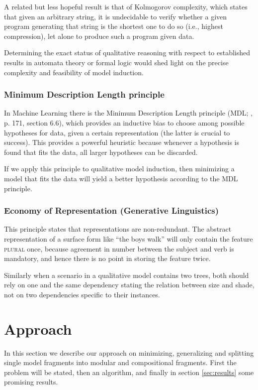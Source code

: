 \documentclass{article} %
\begin{document}
	A related but less hopeful result is that of Kolmogorov complexity,
	which states that given an arbitrary string, it is undecidable to
	verify whether a given program generating that string is the shortest
	one to do so (i.e., highest compression), let alone to produce such a
	program given data.

	Determining the exact status of qualitative reasoning with respect to
	established results in automata theory or formal logic would shed light
	on the precise complexity and feasibility of model induction.

\subsubsection{Minimum Description Length principle}

	In Machine Learning there is the Minimum Description Length principle
	(MDL; \cite{mitchell}, p. 171, section 6.6), which provides an
	inductive bias to choose among possible hypotheses for data, given a
	certain representation (the latter is crucial to success).  This
	provides a powerful heuristic because whenever a hypothesis is found
	that fits the data, all larger hypotheses can be discarded.
	
	If we apply this principle to qualitative model induction, then
	minimizing a model that fits the data will yield a better hypothesis
	according to the MDL principle.
  
\subsubsection{Economy of Representation (Generative Linguistics)}

	This principle states that representations are non-redundant. The
	abstract representation of a surface form like ``the boys walk'' will
	only contain the feature \textsc{plural} once, because agreement in
	number between the subject and verb is mandatory, and hence there is
	no point in storing the feature twice. 

	Similarly when a scenario in a qualitative model contains two trees,
	both should rely on one and the same dependency stating the relation
	between size and shade, not on two dependencies specific to their
	instances. 

\section{Approach}
\label{sec:approach}
In this section we describe our approach on minimizing, generalizing and
splitting single model fragments into modular and compositional fragments.
First the problem will be stated, then an algorithm, and finally in section 
\ref{sec:results} some promising results.
\end{document}
